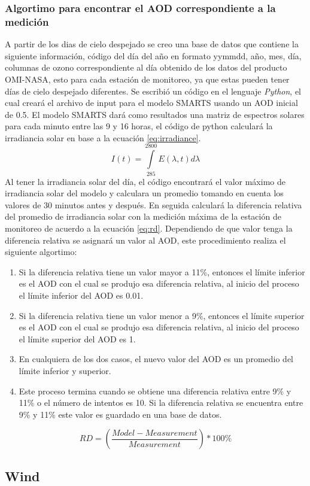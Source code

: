 \subsubsection{Algortimo para encontrar el AOD correspondiente a la medición}
A partir de los dias de cielo despejado se creo una base de datos que contiene la siguiente información,
código del día del año en formato yymmdd, año, mes, día, columnas de ozono correspondiente al día obtenido de los datos del
producto OMI-NASA, esto para cada estación de monitoreo, ya que estas pueden tener días de cielo despejado diferentes.
Se escribió un código en el lenguaje \textit{Python}, el cual creará el archivo de input para el modelo SMARTS usando
un AOD inicial de 0.5. El modelo SMARTS dará como resultados una matriz de espectros solares para cada  minuto entre las 9 y 16 horas,
el código de python calculará la irradiancia solar en base a la ecuación \ref{eq:irradiance}.
\begin{equation}
        I(t) = \int\limits_{285}^{2800} E(\lambda,t) d\lambda
        \label{eq:irradiance}
\end{equation}
Al tener la irradiancia solar del día, el código encontrará el valor máximo de irradiancia solar del modelo y calculara un promedio 
tomando en cuenta los valores de 30 minutos antes y después. En seguida calculará la diferencia relativa
del promedio de irradiancia solar con la medición máxima de la estación de monitoreo de acuerdo a la ecuación \ref{eq:rd}. Dependiendo de que valor tenga la diferencia relativa
se asignará un valor al AOD, este procedimiento realiza el siguiente algortimo:
\begin{enumerate}
    \item Si la diferencia relativa tiene un valor mayor a 11\%, entonces el límite inferior es el AOD con el cual se produjo esa diferencia relativa, al inicio del proceso el límite inferior del AOD es 0.01.
    \item Si la diferencia relativa tiene un valor menor a 9\%, entonces el límite superior es el AOD con el cual se produjo esa diferencia relativa, al inicio del proceso el límite superior del AOD es 1.
    \item En cualquiera de los dos casos, el nuevo valor del AOD es un promedio del límite inferior y superior.
    \item Este proceso termina cuando se obtiene una diferencia relativa entre 9\% y 11\% o el número de intentos es 10. Si la diferencia relativa se encuentra entre 9\% y 11\% este valor es guardado en una base de datos.
\end{enumerate}
\begin{equation}
    RD = \left(\frac{Model-Measurement}{Measurement}\right)*100\%
    \label{eq:rd}
\end{equation}
\subsection{Wind}